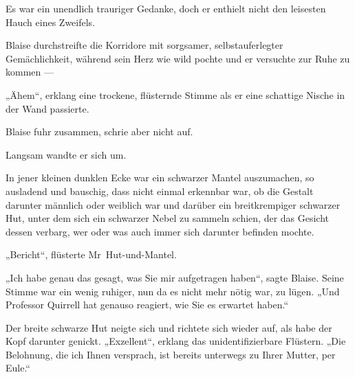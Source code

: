 Es war ein unendlich trauriger Gedanke, doch er enthielt nicht den leisesten Hauch eines Zweifels.


Blaise durchstreifte die Korridore mit sorgsamer, selbstauferlegter Gemächlichkeit, während sein Herz wie wild pochte und er versuchte zur Ruhe zu kommen —

„Ähem“, erklang eine trockene, flüsternde Stimme als er eine schattige Nische in der Wand passierte.

Blaise fuhr zusammen, schrie aber nicht auf.

Langsam wandte er sich um.

In jener kleinen dunklen Ecke war ein schwarzer Mantel auszumachen, so ausladend und bauschig, dass nicht einmal erkennbar war, ob die Gestalt darunter männlich oder weiblich war und darüber ein breitkrempiger schwarzer Hut, unter dem sich ein schwarzer Nebel zu sammeln schien, der das Gesicht dessen verbarg, wer oder was auch immer sich darunter befinden mochte.

„Bericht“, flüsterte Mr~Hut-und-Mantel.

„Ich habe genau das gesagt, was Sie mir aufgetragen haben“, sagte Blaise. Seine Stimme war ein wenig ruhiger, nun da es nicht mehr nötig war, zu lügen.
„Und Professor Quirrell hat genauso reagiert, wie Sie es erwartet haben.“

Der breite schwarze Hut neigte sich und richtete sich wieder auf, als habe der Kopf darunter genickt.
„Exzellent“, erklang das unidentifizierbare Flüstern.
„Die Belohnung, die ich Ihnen versprach, ist bereits unterwegs zu Ihrer Mutter, per Eule.“

